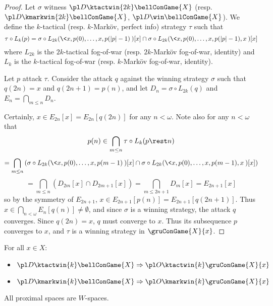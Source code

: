 \begin{proof}
Let $\sigma$ witness $\pl D \ktactwin{2k}\bellConGame{X}$ (resp. $\pl D \kmarkwin{2k}\bellConGame{X}$, $\pl D\win\bellConGame{X}$). We define the $k$-tactical (resp. $k$-Mark\"ov, perfect info) strategy $\tau$ such that
  \[
    \tau\circ L_k(p)
      =
    \sigma\circ L_{2k}(\<x,p(0),\dots,x,p(|p|-1)\>)[x]
      \cap
    \sigma\circ L_{2k}(\<x,p(0),\dots,x,p(|p|-1),x\>)[x]
  \]
where $L_{2k}$ is the $2k$-tactical fog-of-war (resp. $2k$-Mark\"ov fog-of-war, identity) and $L_{k}$ is the $k$-tactical fog-of-war (resp. $k$-Mark\"ov fog-of-war, identity).

Let $p$ attack $\tau$. Consider the attack $q$ against the winning strategy $\sigma$ such that $q(2n)=x$ and $q(2n+1)=p(n)$, and let $D_n=\sigma\circ L_{2k}(q)$ and $E_n=\bigcap_{m\leq n}D_n$.

Certainly, $x\in E_{2n}[x]= E_{2n}[q(2n)]$ for any $n<\omega$. Note also for any $n<\omega$ that
    \[
      p(n) \in
      \bigcap_{m\leq n}\tau\circ L_k(p\rest n)
    \]
    \[
      =
      \bigcap_{m\leq n}\left(
        \sigma\circ L_{2k}(\<x,p(0),\dots,x,p(m-1)\>)[x]\cap
        \sigma\circ L_{2k}(\<x,p(0),\dots,x,p(m-1),x\>)[x]
      \right)
    \]
    \[
      =
      \bigcap_{m\leq n}\left(
        D_{2m}[x]\cap
        D_{2m+1}[x]
      \right) =
      \bigcap_{m\leq 2n+1} D_m[x]=E_{2n+1}[x]
    \]
so by the symmetry of $E_{2n+1}$, $x\in E_{2n+1}[p(n)]= E_{2n+1}[q(2n+1)]$. Thus $x\in \bigcap_{n<\omega} E_n[q(n)]\not=\emptyset$, and since $\sigma$ is a winning strategy, the attack $q$ converges. Since $q(2n)=x$, $q$ must converge to $x$. Thus its subsequence $p$ converges to $x$, and $\tau$ is a winning strategy in $\gruConGame{X}{x}$.
\end{proof}

\begin{cor}
For all $x\in X$:
  \begin{itemize}
    \item
      $\pl D\ktactwin{k} \bellConGame{X} \Rightarrow \pl O \ktactwin{k} \gruConGame{X}{x}$
    \item
      $\pl D\kmarkwin{k} \bellConGame{X} \Rightarrow \pl O \kmarkwin{k} \gruConGame{X}{x}$
  \end{itemize}
\end{cor}

\begin{cor}
  All proximal spaces are $W$-spaces.
\end{cor}

